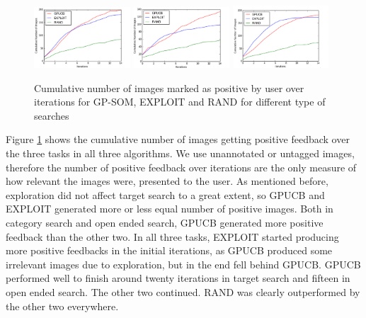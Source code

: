 \documentclass[english]{tktltiki}
\begin{document}
\begin{figure}[h!]
  \centering
    \includegraphics[width=0.32\textwidth]{figures/Target_Positive.png}
    \includegraphics[width=0.32\textwidth]{figures/Category_Positive.png}
    \includegraphics[width=0.32\textwidth]{figures/Open_Positive.png}
    \caption{Cumulative number of images marked as positive by user over iterations for GP-SOM, EXPLOIT and RAND for different type of searches}
    \label{positive_feedback}
\end{figure}

Figure \ref{positive_feedback} shows the cumulative number of images getting positive feedback over the three tasks in all three algorithms. We use unannotated or untagged images, therefore the number of positive feedback over iterations are the only measure of how relevant the images were, presented to the user. As mentioned before, exploration did not affect target search to a great extent, so GPUCB and EXPLOIT generated more or less equal number of positive images. Both in category search and open ended search, GPUCB generated more positive feedback than the other two. In all three tasks, EXPLOIT started producing more positive feedbacks in the initial iterations, as GPUCB produced some irrelevant images due to exploration, but in the end fell behind GPUCB. GPUCB performed well to finish around twenty iterations in target search and fifteen in open ended search. The other two continued. RAND was clearly outperformed by the other two everywhere.
\end{document}
